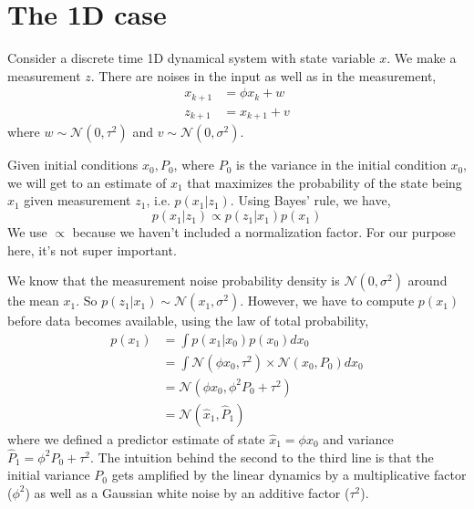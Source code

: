 \documentclass{article}
\begin{document}
\section*{The 1D case}
Consider a discrete time 1D dynamical system with state variable $x$. We make a measurement $z$. There are noises in the input as well as in the measurement,
\begin{equation}
\begin{aligned}
x_{k+1} &= \phi x_k + w\\
z_{k+1} &= x_{k+1} + v
\end{aligned}
\end{equation}
where $w\sim \mathcal{N}(0,\tau^2)$ and $v\sim \mathcal{N}(0, \sigma^2)$.

Given initial conditions $x_0, P_0$, where $P_0$ is the variance in the initial condition $x_0$, we will get to an estimate of $ x_1$ 
that maximizes the probability of the state being $x_1$ given measurement $z_1$, i.e. $p(x_1 | z_1)$.
Using Bayes' rule, we have,
\begin{equation}
\label{eq:Bayes}
p( x_1 | z_1) \propto p(z_1 | x_1) p(x_1)
\end{equation}
We use $\propto$ because we haven't included a normalization factor. For our purpose here, it's not super important.

We know that the measurement noise probability density is $\mathcal{N} (0, \sigma^2)$ around the mean $x_1$.
So $p(z_1 | x_1) \sim \mathcal{N} (x_1, \sigma^2)$.
However, we have to compute $p(x_1)$ before data becomes available, using the law of total probability,
\begin{equation}
\begin{aligned}
\label{eq:px1}
p(x_1) &= \int p(x_1 | x_0) p(x_0) dx_0\\
 &= \int \mathcal{N} (\phi x_0, \tau^2) \times \mathcal{N} (x_0, P_0) dx_0\\
 &=\mathcal{N} (\phi x_0, \phi^2 P_0 + \tau^2)\\
 &=\mathcal{N} (\hat x_1, \hat P_1)
 \end{aligned}
\end{equation}
where we defined a predictor estimate of state $\hat x_1 = \phi x_0$ and variance $\hat P_1 = \phi^2 P_0 + \tau^2$.
The intuition behind the second to the third line is that the initial variance $P_0$ gets amplified by the linear dynamics by a multiplicative factor ($\phi^2$)
as well as a Gaussian white noise by an additive factor ($\tau^2$).
\end{document}
